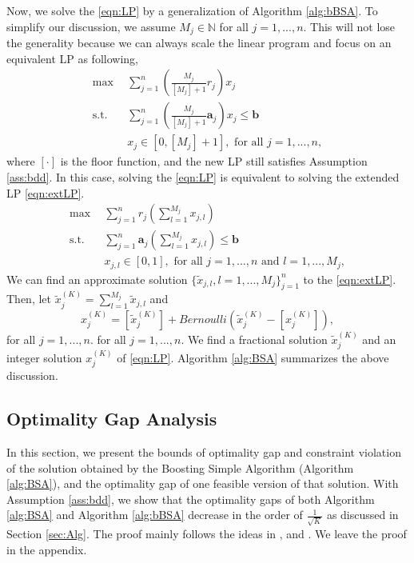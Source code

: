 \documentclass{article} %
\begin{document}
Now, we solve the \eqref{eqn:LP} by a generalization of Algorithm \ref{alg:bBSA}. To simplify our discussion, we assume $M_j\in\mathbb{N}$ for all $j=1,...,n$. This will not lose the generality because we can always scale the linear program and focus on an equivalent LP as following,
\begin{align*}
    \max \ \ & \sum\limits_{j=1}^{n}\left(\frac{M_j}{[M_j]+1}r_j\right)x_{j}   \\
    \text{s.t. }\ & \sum\limits_{j=1}^{n}\left(\frac{M_j}{[M_j]+1}\bm{a}_j\right)x_{j} \le \bm{b} \nonumber  \\ 
    & x_{j} \in [0,[M_j]+1], \text{ for all } j=1,...,n\nonumber,
\end{align*}
where $[\cdot]$ is the floor function, and the new LP still satisfies Assumption \ref{ass:bdd}. 
In this case, solving the \eqref{eqn:LP} is equivalent to solving the extended LP \eqref{eqn:extLP}.
\begin{align}
   \tag{extLP} \max \ \ & \sum\limits_{j=1}^{n}r_j\left(\sum\limits_{l=1}^{M_j}x_{j,l}\right) \label{eqn:extLP}  \\
    \text{s.t. }\ & \sum\limits_{j=1}^{n}\bm{a}_j\left(\sum\limits_{l=1}^{M_j}x_{j,l}\right) \le \bm{b} \nonumber  \\ 
    & x_{j,l} \in [0,1], \text{ for all } j=1,...,n \text{ and } l=1,...,M_j  \nonumber,
\end{align}
We can find an approximate solution $\{\tilde{x}_{j,l},l=1,...,M_j\}_{j=1}^{n}$ to the \eqref{eqn:extLP}. Then, let $\tilde{x}_j^{(K)}=\sum\limits_{l=1}^{M_j}\tilde{x}_{j,l}$ and 
$$
    x_j^{(K)} = [\tilde{x}_j^{(K)}]+Bernoulli(\tilde{x}_j^{(K)}-[x_j^{(K)}]),
$$
for all $j=1,...,n$. for all $j=1,...,n$. We find a fractional solution $\tilde{x}_j^{(K)}$ and an integer solution $x_j^{(K)}$ of \eqref{eqn:LP}. Algorithm \ref{alg:BSA} summarizes the above discussion.



\subsection{Optimality Gap Analysis}
\label{sec:optgap}
In this section, we present the bounds of optimality gap and constraint violation of the solution obtained by the Boosting Simple Algorithm (Algorithm \ref{alg:BSA}), and the optimality gap of one feasible version of that solution. With Assumption \ref{ass:bdd}, we show that the optimality gaps of both Algorithm \ref{alg:BSA} and Algorithm \ref{alg:bBSA} decrease in the order of $\frac{1}{\sqrt{K}}$ as discussed in Section \ref{sec:Alg}. The proof mainly follows the ideas in \cite{li2020simple}, \cite{balseiro2020dual} and \cite{balseiro2020best}. We leave the proof in the appendix.
\end{document}

